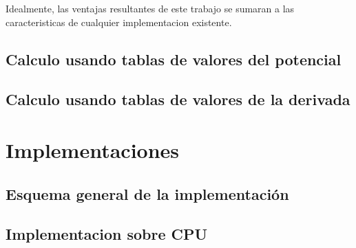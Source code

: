\documentclass[a4paper,10pt]{report}
\begin{document}
Idealmente, las ventajas resultantes de este trabajo se sumaran a las caracteristicas de cualquier implementacion existente. 









\section{Calculo usando tablas de valores del potencial }





\section{Calculo usando tablas de valores de la derivada  }


















\chapter{Implementaciones}

\section{Esquema general de la implementación}
\section{Implementacion sobre CPU}
\end{document}

